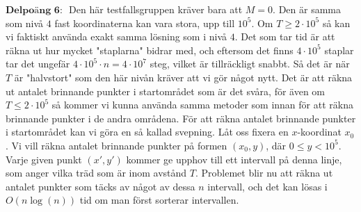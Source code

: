 $\textbf{Delpoäng 6: }$ Den här testfallsgruppen kräver bara att $M = 0$. Den är samma som nivå $4$ fast koordinaterna kan vara stora, upp till $10^5$. Om $T \geq 2\cdot 10^5$ så kan vi faktiskt använda exakt samma lösning som i nivå $4$. Det som tar tid är att räkna ut hur mycket "staplarna" bidrar med, och eftersom det finns $4\cdot10^5$ staplar tar det ungefär $4\cdot 10^5\cdot n = 4\cdot 10^7$ steg, vilket är tillräckligt snabbt. Så det är när $T$ är "halvstort" som den här nivån kräver att vi gör något nytt. Det är att räkna ut antalet brinnande punkter i startområdet som är det svåra, för även om $T \leq 2\cdot 10^5$ så kommer vi kunna använda samma metoder som innan för att räkna brinnande punkter i de andra områdena. För att räkna antalet brinnande punkter i startområdet kan vi göra en så kallad svepning. Låt oss fixera en $x$-koordinat $x_0$. Vi vill räkna antalet brinnande punkter på formen $(x_0,y)$, där $0 \leq y < 10^5$. Varje given punkt $(x',y')$ kommer ge upphov till ett intervall på denna linje, som anger vilka träd som är inom avstånd $T$. Problemet blir nu att räkna ut antalet punkter som täcks av något av dessa $n$ intervall, och det kan lösas i $O(n\log(n))$ tid om man först sorterar intervallen. \\

